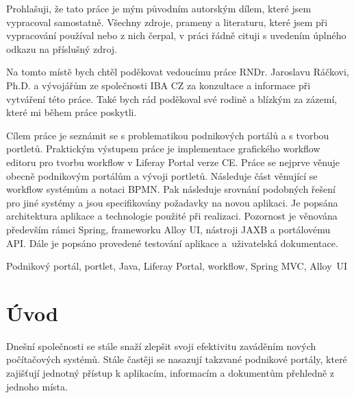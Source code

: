 \documentclass{fithesis}
\begin{document}
\FrontMatter
\ThesisTitlePage

\begin{ThesisDeclaration}
Prohlašuji, že tato práce je mým původním autorským dílem, které jsem
vypracoval samostatně. Všechny zdroje, prameny a literaturu, které jsem při vypracování používal nebo z nich čerpal, v práci řádně cituji s uvedením
úplného odkazu na příslušný zdroj.\AdvisorName
\end{ThesisDeclaration}

\begin{ThesisThanks}
Na tomto místě bych chtěl poděkovat vedoucímu práce RNDr. Jaroslavu Ráčkovi, Ph.D. a vývojářům ze společnosti IBA CZ za konzultace a informace při vytváření této práce. Také bych rád poděkoval své rodině a blízkým za zázemí, které mi během práce poskytli.
\end{ThesisThanks}

\begin{ThesisAbstract}
Cílem práce je seznámit se s problematikou podnikových portálů a s tvorbou portletů. Praktickým výstupem práce je implementace grafického workflow editoru pro tvorbu workflow v Liferay Portal verze CE. Práce se nejprve věnuje obecně podnikovým portálům a vývoji portletů. Následuje část věnující se workflow systémům a notaci BPMN. Pak následuje srovnání podobných řešení pro jiné systémy a jsou specifikovány požadavky na novou aplikaci. Je popsána architektura aplikace a technologie použité při realizaci. Pozornost je věnována především rámci Spring, frameworku Alloy UI, nástroji JAXB a portálovému API. Dále je popsáno provedené testování aplikace a~uživatelská dokumentace.
\end{ThesisAbstract}

\begin{ThesisKeyWords}
Podnikový portál, portlet, Java, Liferay Portal, workflow, Spring MVC, Alloy~UI
\end{ThesisKeyWords}


\MainMatter
\setcounter{secnumdepth}{4}
\tableofcontents

\chapter{Úvod}
Dnešní společnosti se stále snaží zlepšit svoji efektivitu zaváděním nových počítačových systémů. Stále častěji se nasazují takzvané podnikové portály, které zajišťují jednotný přístup k aplikacím, informacím a dokumentům přehledně z jednoho místa.
\end{document}
